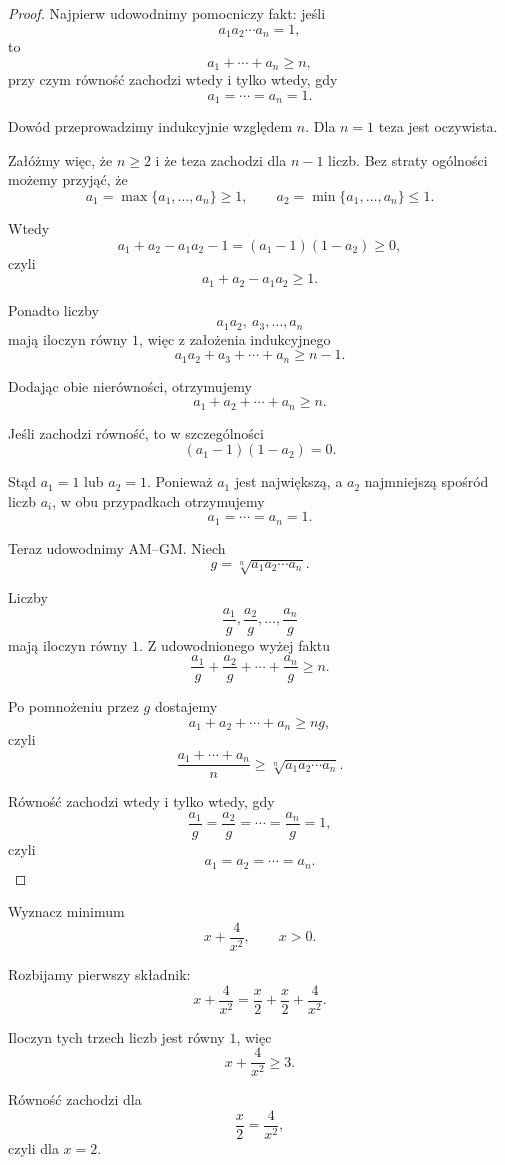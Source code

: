 \documentclass{lecture-kuznia}
\begin{document}
\begin{proof}
	Najpierw udowodnimy pomocniczy fakt: jeśli
	\[
		a_1a_2\cdots a_n=1,
	\]
	to
	\[
		a_1+\cdots+a_n\ge n,
	\]
	przy czym równość zachodzi wtedy i tylko wtedy, gdy
	\[
		a_1=\cdots=a_n=1.
	\]

	Dowód przeprowadzimy indukcyjnie względem $n$.
	Dla $n=1$ teza jest oczywista.

	Załóżmy więc, że $n\ge2$ i że teza zachodzi dla $n-1$ liczb.
	Bez straty ogólności możemy przyjąć, że
	\[
		a_1=\max\{a_1,\dots,a_n\}\ge1,
		\qquad
		a_2=\min\{a_1,\dots,a_n\}\le1.
	\]

	Wtedy
	\[
		a_1+a_2-a_1a_2-1
		=
		(a_1-1)(1-a_2)\ge0,
	\]
	czyli
	\[
		a_1+a_2-a_1a_2\ge1.
	\]

	Ponadto liczby
	\[
		a_1a_2,\ a_3,\dots,a_n
	\]
	mają iloczyn równy $1$, więc z założenia indukcyjnego
	\[
		a_1a_2+a_3+\cdots+a_n\ge n-1.
	\]

	Dodając obie nierówności, otrzymujemy
	\[
		a_1+a_2+\cdots+a_n\ge n.
	\]

	Jeśli zachodzi równość, to w szczególności
	\[
		(a_1-1)(1-a_2)=0.
	\]

	Stąd $a_1=1$ lub $a_2=1$. Ponieważ $a_1$ jest największą, a $a_2$
	najmniejszą spośród liczb $a_i$, w obu przypadkach otrzymujemy
	\[
		a_1=\cdots=a_n=1.
	\]

	Teraz udowodnimy AM--GM. Niech
	\[
		g=\sqrt[n]{a_1a_2\cdots a_n}.
	\]

	Liczby
	\[
		\frac{a_1}{g},\frac{a_2}{g},\dots,\frac{a_n}{g}
	\]
	mają iloczyn równy $1$. Z udowodnionego wyżej faktu
	\[
		\frac{a_1}{g}+\frac{a_2}{g}+\cdots+\frac{a_n}{g}\ge n.
	\]

	Po pomnożeniu przez $g$ dostajemy
	\[
		a_1+a_2+\cdots+a_n\ge ng,
	\]
	czyli
	\[
		\frac{a_1+\cdots+a_n}{n}
		\ge
		\sqrt[n]{a_1a_2\cdots a_n}.
	\]

	Równość zachodzi wtedy i tylko wtedy, gdy
	\[
		\frac{a_1}{g}=\frac{a_2}{g}=\cdots=\frac{a_n}{g}=1,
	\]
	czyli
	\[
		a_1=a_2=\cdots=a_n.
	\]
\end{proof}

\begin{example}\label{E1}
	Wyznacz minimum
	\[
		x+\frac{4}{x^2},\qquad x>0.
	\]
\end{example}

\begin{solution*}[\ref{E1}]
	Rozbijamy pierwszy składnik:
	\[
		x+\frac4{x^2}
		=
		\frac x2+\frac x2+\frac4{x^2}.
	\]

	Iloczyn tych trzech liczb jest równy $1$, więc
	\[
		x+\frac4{x^2}\ge3.
	\]

	Równość zachodzi dla
	\[
		\frac x2=\frac4{x^2},
	\]
	czyli dla $x=2$.
\end{solution*}
\end{document}
